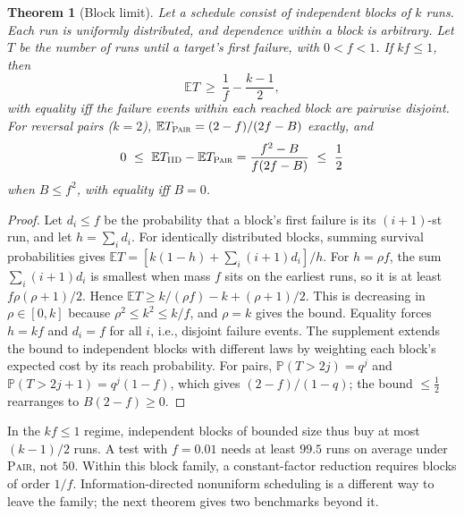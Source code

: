 \documentclass[conference,letterpaper]{IEEEtran}
\newtheorem{theorem}{Theorem}
\theoremstyle{definition}
\newcommand{\Prb}{\mathbb{P}}
\newcommand{\E}{\mathbb{E}}
\newcommand{\IIDp}{\textup{\textsc{IID}}}
\newcommand{\PAIRp}{\textup{\textsc{Pair}}}
\begin{document}
\begin{theorem}[Block limit]\label{thm:block}\label{thm:half}
Let a schedule consist of independent blocks of $k$ runs. Each run is uniformly distributed, and dependence within a block is arbitrary. Let $T$ be the number of runs until a target's first failure, with $0<f<1$. If $kf\le1$, then
\[
\E T\ \ge\ \frac1f-\frac{k-1}{2},
\]
with equality iff the failure events within each reached block are pairwise disjoint. For reversal pairs ($k=2$), $\E T_{\PAIRp{}}=(2-f)/(2f-B)$ exactly, and
\[
0\ \le\ \E T_{\IIDp{}}-\E T_{\PAIRp{}}=\frac{f^2-B}{f(2f-B)}\ \le\ \frac12
\]
when $B\le f^2$, with equality iff $B=0$.
\end{theorem}
\begin{proof}
Let $d_i\le f$ be the probability that a block's first failure is its $(i{+}1)$-st run, and let $h=\sum_i d_i$. For identically distributed blocks, summing survival probabilities gives $\E T=[k(1-h)+\sum_i(i+1)d_i]/h$. For $h=\rho f$, the sum $\sum_i(i+1)d_i$ is smallest when mass $f$ sits on the earliest runs, so it is at least $f\rho(\rho+1)/2$. Hence $\E T\ge k/(\rho f)-k+(\rho+1)/2$. This is decreasing in $\rho\in[0,k]$ because $\rho^2\le k^2\le k/f$, and $\rho=k$ gives the bound. Equality forces $h=kf$ and $d_i=f$ for all $i$, i.e., disjoint failure events. The supplement extends the bound to independent blocks with different laws by weighting each block's expected cost by its reach probability. For pairs, $\Prb(T>2j)=q^j$ and $\Prb(T>2j{+}1)=q^j(1-f)$, which gives $(2-f)/(1-q)$; the bound $\le\frac12$ rearranges to $B(2-f)\ge0$.
\end{proof}
In the $kf\le1$ regime, independent blocks of bounded size thus buy at most $(k-1)/2$ runs. A test with $f=0.01$ needs at least $99.5$ runs on average under \PAIRp{}, not $50$. Within this block family, a constant-factor reduction requires blocks of order $1/f$. Information-directed nonuniform scheduling is a different way to leave the family; the next theorem gives two benchmarks beyond it.
\end{document}
